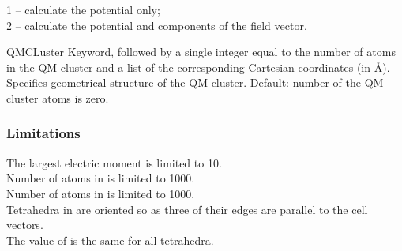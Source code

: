\begin{keywordlist}
\hspace*{5mm}1 -- calculate the potential only; \\
\hspace*{5mm}2 -- calculate the potential and components of the field vector.
\item[QMCLuster]
Keyword, followed by a single integer equal to the number of atoms in the QM cluster
and a list of the corresponding Cartesian coordinates (in \AA).
Specifies geometrical structure of the QM cluster.
Default: number of the QM cluster atoms is zero.
\end{keywordlist}

\subsubsection{Limitations}
The largest electric moment  is limited to 10.\\
Number of atoms in  is limited to 1000.\\
Number of atoms in  is limited to 1000.\\
Tetrahedra in  are oriented so as three of their edges are parallel to the cell vectors.\\
The value of  is the same for all tetrahedra.



